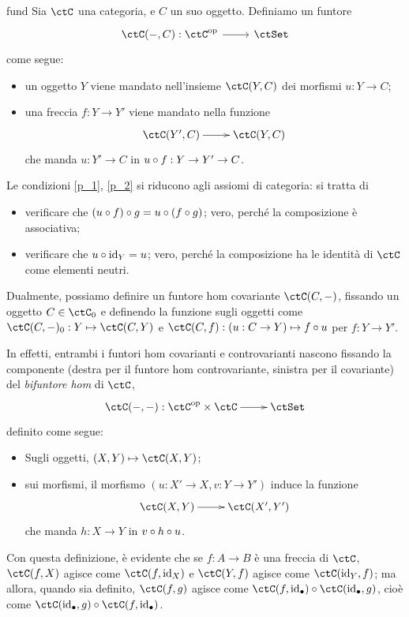 \begin{hExample}{fund}\label{ex_hom_funtore}
	Sia \(\ctC\) una categoria, e \(C\) un suo oggetto. Definiamo un funtore
	\[\dmFun{\Hom{\ctC}(-,C)}{\ctC^\op}{\ctSet}\]
	come segue:
	\begin{itemize}
		\item un oggetto \(Y\) viene mandato nell'insieme \(\Hom{\ctC}(Y,C)\) dei morfismi \(u : Y\to C\);
		\item una freccia \(f : Y\to Y'\) viene mandato nella funzione
		      \[\xymatrix{
				      \Hom{\ctC}(Y',C) \ar[r] & \Hom{\ctC}(Y,C)
			      }\]
		      che manda \(u : Y'\to C\) in \(u\circ f : Y\to Y' \to C\).
	\end{itemize}
	Le condizioni \ref{p_1}, \ref{p_2} si riducono agli assiomi di categoria: si tratta di
	\begin{itemize}
		\item verificare che \((u\circ f)\circ g = u\circ (f\circ g)\); vero, perché la composizione è associativa;
		\item verificare che \(u\circ \mathrm{id}_Y = u\); vero, perché la composizione ha le identità di \(\ctC\) come elementi neutri.
	\end{itemize}
	Dualmente, possiamo definire un funtore hom covariante \(\Hom{\ctC}(C,-)\), fissando un oggetto \(C\in\ctC_0\) e definendo la funzione sugli oggetti come \(\Hom{\ctC}(C,-)_0 : Y\mapsto \Hom{\ctC}(C,Y)\) e \(\Hom{\ctC}(C,f) : (u : C\to Y)\mapsto f\cmp u\) per \(f : Y\to Y'\).

	 In effetti, entrambi i funtori hom covarianti e controvarianti nascono fissando la componente (destra per il funtore hom controvariante, sinistra per il covariante) del \emph{bifuntore hom} di \(\ctC\),
	\[\xymatrix{\Hom\ctC(-,-) : \ctC^\op\times\ctC \ar[r] & \ctSet}\]
	definito come segue:
	\begin{itemize}
		\item Sugli oggetti, \((X,Y)\mapsto \Hom{\ctC}(X,Y)\);
		\item sui morfismi, il morfismo \((u : X'\to X, v : Y\to Y')\) induce la funzione
		      \[\xymatrix{\Hom{\ctC}(X,Y) \ar[r] & \Hom{\ctC}(X',Y')}\]
		      che manda \(h : X\to Y\) in \(v\circ h\circ u\).
	\end{itemize}
	Con questa definizione, è evidente che se \(f : A\to B\) è una freccia di \(\ctC\), \(\Hom\ctC(f,X)\) agisce come \(\Hom\ctC(f,\id_X)\) e \(\Hom\ctC(Y,f)\) agisce come \(\Hom\ctC(\id_Y,f)\); ma allora, quando sia definito, \(\Hom\ctC(f,g)\) agisce come \(\Hom\ctC(f,\id_\bullet)\cmp\Hom\ctC(\id_\bullet,g)\), cioè come \(\Hom\ctC(\id_\bullet,g)\cmp\Hom\ctC(f,\id_\bullet)\).
\end{hExample}
